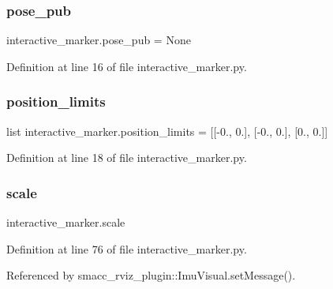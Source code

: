 \subsubsection{\texorpdfstring{pose\+\_\+pub}{pose\_pub}}
{\footnotesize\ttfamily interactive\+\_\+marker.\+pose\+\_\+pub = None}



Definition at line 16 of file interactive\+\_\+marker.\+py.

\mbox{\label{namespaceinteractive__marker_aae45ba5b707ff3b4546ae4bbb9b49b39}} 
\subsubsection{\texorpdfstring{position\+\_\+limits}{position\_limits}}
{\footnotesize\ttfamily list interactive\+\_\+marker.\+position\+\_\+limits = \mbox{[}\mbox{[}-\/0., 0.\mbox{]}, \mbox{[}-\/0., 0.\mbox{]}, \mbox{[}0., 0.\mbox{]}\mbox{]}}



Definition at line 18 of file interactive\+\_\+marker.\+py.

\mbox{\label{namespaceinteractive__marker_ae2c7b9865bba9817db3359dba96e4507}} 
\subsubsection{\texorpdfstring{scale}{scale}}
{\footnotesize\ttfamily interactive\+\_\+marker.\+scale}



Definition at line 76 of file interactive\+\_\+marker.\+py.



Referenced by smacc\+\_\+rviz\+\_\+plugin\+::\+Imu\+Visual.\+set\+Message().

\mbox{\label{namespaceinteractive__marker_a0913a920340099e56f9b000d508380eb}} 
